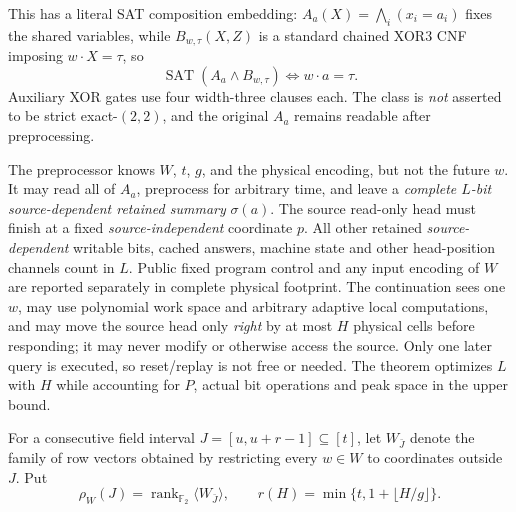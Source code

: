 \documentclass[10pt]{article}
\newcommand{\F}{\mathbb F_2}
\begin{document}
This has a literal SAT composition embedding: $A_a(X)=\bigwedge_i(x_i=a_i)$ fixes the shared variables, while $B_{w,\tau}(X,Z)$ is a standard chained XOR3 CNF imposing $w\cdot X=\tau$, so
\[\operatorname{SAT}(A_a\land B_{w,\tau})\iff w\cdot a=\tau.\]
Auxiliary XOR gates use four width-three clauses each. The class is \emph{not} asserted to be strict exact-$(2,2)$, and the original $A_a$ remains readable after preprocessing.

The preprocessor knows $W$, $t$, $g$, and the physical encoding, but not the future $w$. It may read all of $A_a$, preprocess for arbitrary time, and leave a \emph{complete $L$-bit source-dependent retained summary} $\sigma(a)$. The source read-only head must finish at a fixed \emph{source-independent} coordinate $p$. All other retained \emph{source-dependent} writable bits, cached answers, machine state and other head-position channels count in $L$. Public fixed program control and any input encoding of $W$ are reported separately in complete physical footprint. The continuation sees one $w$, may use polynomial work space and arbitrary adaptive local computations, and may move the source head only \emph{right} by at most $H$ physical cells before responding; it may never modify or otherwise access the source. Only one later query is executed, so reset/replay is not free or needed. The theorem optimizes $L$ with $H$ while accounting for $P$, actual bit operations and peak space in the upper bound.

For a consecutive field interval $J=[u,u+r-1]\subseteq[t]$, let $W_{\bar J}$ denote the family of row vectors obtained by restricting every $w\in W$ to coordinates outside $J$. Put
\[\rho_W(J)=\operatorname{rank}_{\F}\langle W_{\bar J}\rangle,\qquad r(H)=\min\{t,1+\lfloor H/g\rfloor\}.\]
\end{document}
